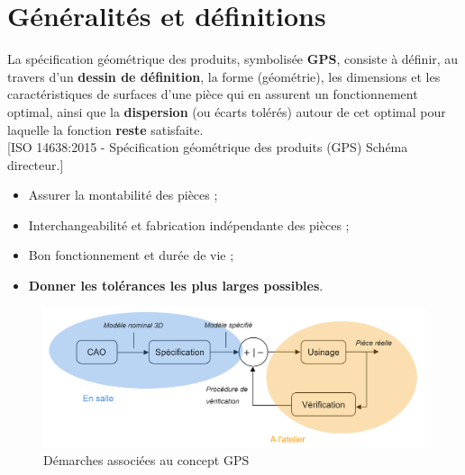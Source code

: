 \documentclass[
	11pt, %
	fleqn, %
	a4paper, %
]{LegrandOrangeBook}
\begin{document}
\section{Généralités et définitions}


\begin{definition}

La spécification géométrique des produits, symbolisée \textbf{GPS}, consiste à définir, au travers d’un \textbf{dessin de définition}, la forme (géométrie), les dimensions et les caractéristiques de surfaces d’une pièce qui en assurent un fonctionnement optimal, ainsi que la \textbf{dispersion} (ou écarts tolérés) autour de cet optimal pour laquelle la fonction \textbf{reste} satisfaite.\\
    
[ISO 14638:2015 - Spécification géométrique des produits (GPS) Schéma directeur.]

\end{definition}


\begin{theorem}

\begin{itemize}
    \item Assurer la montabilité des pièces ;
    \item Interchangeabilité et fabrication indépendante des pièces ;
    \item Bon fonctionnement et durée de vie ;
    \item \textbf{Donner les tolérances les plus larges possibles}.
\end{itemize}
\end{theorem}


\begin{figure}[H] %
	\centering %
	\includegraphics[width=1\textwidth]{Images/diag11.png} 
	\caption{Démarches associées au concept GPS}
	\label{diag11} %
\end{figure}
\end{document}
